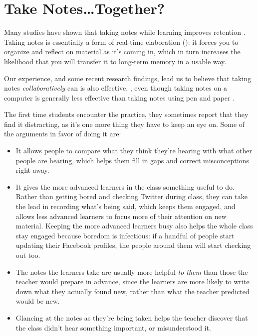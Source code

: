\section{Take Notes{\ldots}Together?}\label{s:classroom-notetaking}

Many studies have shown that taking notes while learning improves
retention \cite{Aike1975,Boha2011}.  Taking notes is essentially a
form of real-time elaboration (): it
forces you to organize and reflect on material as it's coming in,
which in turn increases the likelihood that you will transfer it to
long-term memory in a usable way.

Our experience, and some recent research findings, lead us to believe
that taking notes \emph{collaboratively} can is also effective,
\cite{Ornd2015,Yang2015}, even though taking notes on a computer is
generally less effective than taking notes using pen and paper
\cite{Muel2014}.

The first time students encounter the practice, they sometimes report
that they find it distracting, as it's one more thing they have to
keep an eye on.  Some of the arguments in favor of doing it are:

\begin{itemize}

  \item
    It allows people to compare what they think they're hearing with
    what other people are hearing, which helps them fill in gaps and
    correct misconceptions right away.

  \item
    It gives the more advanced learners in the class something useful
    to do. Rather than getting bored and checking Twitter during
    class, they can take the lead in recording what's being said,
    which keeps them engaged, and allows less advanced learners to
    focus more of their attention on new material. Keeping the more
    advanced learners busy also helps the whole class stay engaged
    because boredom is infectious: if a handful of people start
    updating their Facebook profiles, the people around them will
    start checking out too.

  \item
    The notes the learners take are usually more helpful \emph{to
      them} than those the teacher would prepare in advance, since the
    learners are more likely to write down what they actually found
    new, rather than what the teacher predicted would be new.

  \item
    Glancing at the notes as they're being taken helps the teacher
    discover that the class didn't hear something important, or
    misunderstood it.

\end{itemize}


